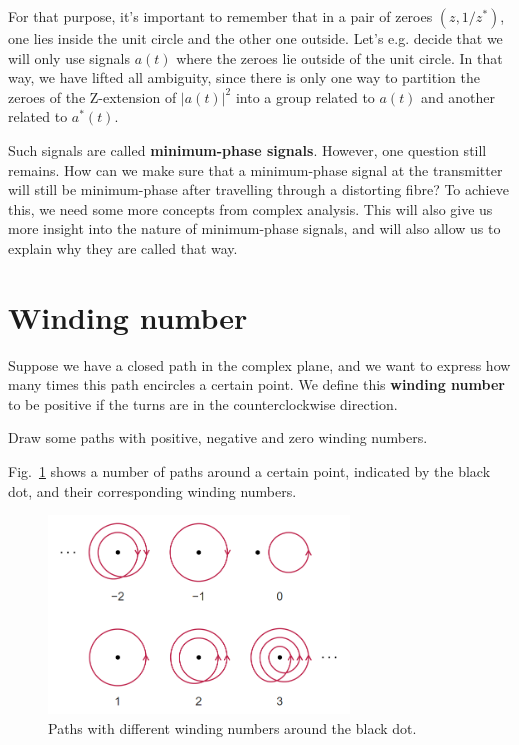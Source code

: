 \pagebreak

For that purpose, it's important to remember that in a pair of zeroes $(z, 1/z^*)$, one lies inside the unit circle and the other one outside. Let's e.g. decide that we will only use signals $a(t)$ where the zeroes lie outside of the unit circle. In that way, we have lifted all ambiguity, since there is only one way to partition the zeroes of the Z-extension of $|a(t)|^2$ into a group related to $a(t)$ and another related to $a^*(t)$.

Such signals are called \textbf{minimum-phase signals}. However, one question still remains. How can we make sure that a minimum-phase signal at the transmitter will still be minimum-phase after travelling through a distorting fibre? To achieve this, we need some more concepts from complex analysis. This will also give us more insight into the nature of minimum-phase signals, and will also allow us to explain why they are called that way.

\pagebreak

\section{Winding number}

Suppose we have a closed path in the complex plane, and we want to express how many times this path encircles a certain point. We define this \textbf{winding number} to be positive if the turns are in the counterclockwise direction.

\begin{cue}
Draw some paths with positive, negative and zero winding numbers.    
\end{cue}

Fig.~\ref{fig-winding} shows a number of paths around a certain point, indicated by the black dot, and their corresponding winding numbers.

\begin{figure}[h]
\centering
\includegraphics[width=8cm]{kk/figures/winding_number}
\caption{Paths with different winding numbers around the black dot.}
\label{fig-winding}
\end{figure}

